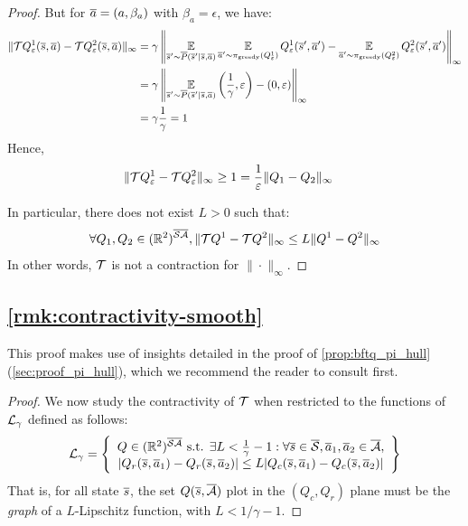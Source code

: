 \begin{subappendices}
\begin{proof}
	But for $\overline{a}=(a,\beta_a)$ with $\beta_a = \epsilon$, we have:
	\begin{align*}
	\|\mathcal{T} Q_\varepsilon^1(\overline{s}, \overline{a}) - \mathcal{T} Q_\varepsilon^2(\overline{s}, \overline{a})\|_\infty &= \gamma\left\|\operatorname*{\mathbb{E}}\limits_{\overline{s}'\sim\overline{P}(\overline{s}'|\overline{s},\overline{a})} \operatorname*{\mathbb{E}}\limits_{\overline{a}'\sim\pi_\text{greedy}(Q^1_\varepsilon)}Q^1_\varepsilon(\overline{s}',\overline{a}') - \operatorname*{\mathbb{E}}\limits_{\overline{a}'\sim\pi_\text{greedy}(Q^2_\varepsilon)}Q^2_\varepsilon(\overline{s}',\overline{a}')\right\|_\infty \\
	&= \gamma\left\|\operatorname*{\mathbb{E}}\limits_{\overline{s}'\sim\overline{P}(\overline{s}'|\overline{s},\overline{a})}\left(\frac{1}{\gamma}, \varepsilon\right) - (0, \varepsilon)\right\|_\infty \\
	&= \gamma\frac{1}{\gamma} = 1
	\end{align*}
	Hence, 
	\begin{align*}
	\|\mathcal{T} Q_\varepsilon^1 - \mathcal{T} Q_\varepsilon^2\|_\infty &\geq 1 = \frac{1}{\varepsilon} \|Q_1-Q_2\|_\infty
	\end{align*}
	
	In particular, there does not exist $L>0$ such that:
	$$\forall Q_1,Q_2\in(\mathbb{R}^2)^{\overline{\mathcal{S}}\overline{\mathcal{A}}}, \|\mathcal{T} Q^1 - \mathcal{T} Q^2\|_\infty \leq L \|Q^1 - Q^2\|_\infty$$
	In other words, $\mathcal{T}$ is not a contraction for $\|\cdot\|_\infty$.
\end{proof}

\subsection{\autoref{rmk:contractivity-smooth}}
\label{proof:contraction-with-smooth}

\begin{remark}
	This proof makes use of insights detailed in the proof of \autoref{prop:bftq_pi_hull} (\autoref{sec:proof_pi_hull}), which we recommend the reader to consult first.
\end{remark}

\begin{proof}
	We now study the contractivity of $\mathcal{T}$ when restricted to the functions of $\mathcal{L}_\gamma$ defined as follows:
	\begin{equation}
	\mathcal{L}_\gamma = \left\{\begin{array}{cc}
	Q\in(\mathbb{R}^2)^{\overline{\mathcal{S}}\overline{\mathcal{A}}}\text{ s.t. }\exists L<\frac{1}{\gamma}-1: \forall \overline{s}\in\overline{\mathcal{S}},\overline{a}_1,\overline{a}_2\in\overline{\mathcal{A}},   \\
	|Q_r(\overline{s},\overline{a}_1) - Q_r(\overline{s},\overline{a}_2)| \leq L|Q_c(\overline{s},\overline{a}_1) - Q_c(\overline{s},\overline{a}_2)|
	\end{array}\right\}
	\end{equation}
	That is, for all state $\overline{s}$, the set $Q(\overline{s}, \overline{\mathcal{A}})$ plot in the $(Q_c,Q_r)$ plane must be the \emph{graph} of a $L$-Lipschitz function, with $L<1/\gamma-1$.
	

\end{proof}
\end{subappendices}
